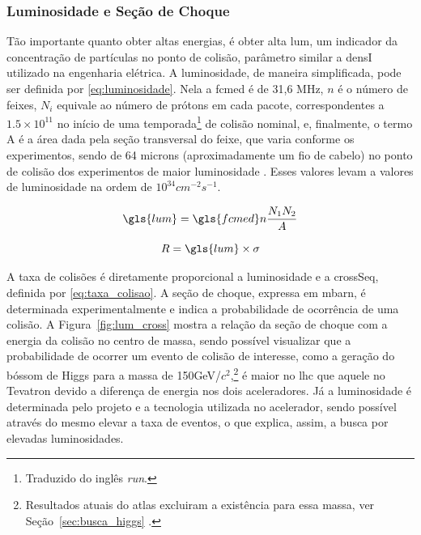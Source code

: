 \subsubsection{Luminosidade e Seção de Choque}

\label{sssec:Lum_Crosseq}
Tão importante quanto obter altas energias, é obter alta
\gls{lum}, um indicador da concentração 
de partículas no ponto de colisão, parâmetro similar a \gls{densI} 
utilizado na engenharia elétrica. A luminosidade, de maneira
simplificada, pode ser definida por
\ref{eq:luminosidade}. Nela a \gls{fcmed} é de 31,6 MHz, $n$ é o número de feixes, 
$N_i$ equivale ao número de prótons em cada pacote, correspondentes a $1.5\times10^{11}$ 
no início de uma temporada\footnote{Traduzido do inglês \emph{run}.} de colisão nominal, e,
finalmente, o termo A é a área dada pela seção transversal do feixe, que varia
conforme os experimentos, sendo de 64 microns (aproximadamente um fio de cabelo) 
no ponto de colisão dos experimentos de maior luminosidade \cite{webLHC}. 
Esses valores levam a valores de luminosidade na ordem de
$10^{34}cm^{-2}s^{-1}$.


\begin{equation} \label{eq:luminosidade}
\gls{lum}=\gls{fcmed}n\frac{N_1 N_2}{A}
\end{equation}

\begin{equation}
R = \gls{lum} \times \sigma
\label{eq:taxa_colisao}
\end{equation}

A taxa de colisões é diretamente proporcional a luminosidade e a \gls{crossSeq}, 
definida por \ref{eq:taxa_colisao}. A seção de choque, expressa em mbarn, 
é determinada experimentalmente e indica a probabilidade de ocorrência de uma colisão. 
A Figura~\ref{fig:lum_cross} mostra a relação da seção de choque com a energia
da colisão no centro de massa, sendo possível visualizar que a probabilidade 
de ocorrer um evento de colisão de interesse, como a geração do
bóssom de Higgs para a massa de 150GeV/$c^2$,\footnote{Resultados atuais do \gls{atlas} excluiram a
existência para essa massa, ver Seção~\ref{sec:busca_higgs} \cite{atlas_higgs}.} é maior no \gls{lhc} 
que aquele no Tevatron devido a diferença de energia nos dois aceleradores.
Já a luminosidade é determinada pelo projeto e a tecnologia utilizada no 
acelerador, sendo possível através do mesmo elevar a taxa de eventos, o que
explica, assim, a busca por elevadas luminosidades.

